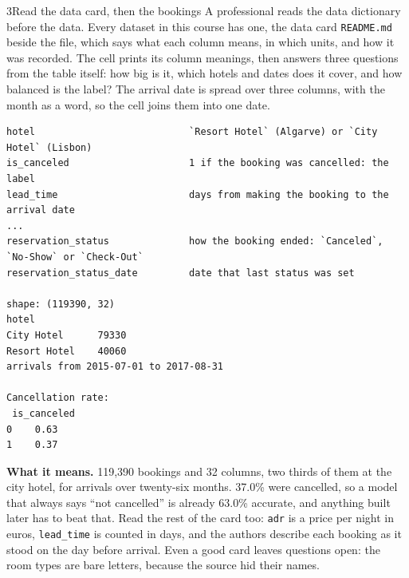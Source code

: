 \begin{labquestion}{3}{Read the data card, then the bookings}
A professional reads the data dictionary before the data. Every dataset in this course has one, the data card \texttt{README.md} beside the file, which says what each column means, in which units, and how it was recorded. The cell prints its column meanings, then answers three questions from the table itself: how big is it, which hotels and dates does it cover, and how balanced is the label? The arrival date is spread over three columns, with the month as a word, so the cell joins them into one date.
\end{labquestion}
\begin{labanswer}

\begin{refoutput}
\begin{lstlisting}[style=utpterminal]
hotel                           `Resort Hotel` (Algarve) or `City Hotel` (Lisbon)
is_canceled                     1 if the booking was cancelled: the label
lead_time                       days from making the booking to the arrival date
...
reservation_status              how the booking ended: `Canceled`, `No-Show` or `Check-Out`
reservation_status_date         date that last status was set

shape: (119390, 32)
hotel
City Hotel      79330
Resort Hotel    40060
arrivals from 2015-07-01 to 2017-08-31

Cancellation rate:
 is_canceled
0    0.63
1    0.37
\end{lstlisting}
\end{refoutput}

\textbf{What it means.} 119,390 bookings and 32 columns, two thirds of them at the city hotel, for arrivals over twenty-six months. 37.0\% were cancelled, so a model that always says ``not cancelled'' is already 63.0\% accurate, and anything built later has to beat that. Read the rest of the card too: \texttt{adr} is a price per night in euros, \texttt{lead\_time} is counted in days, and the authors describe each booking as it stood on the day before arrival. Even a good card leaves questions open: the room types are bare letters, because the source hid their names.
\end{labanswer}

